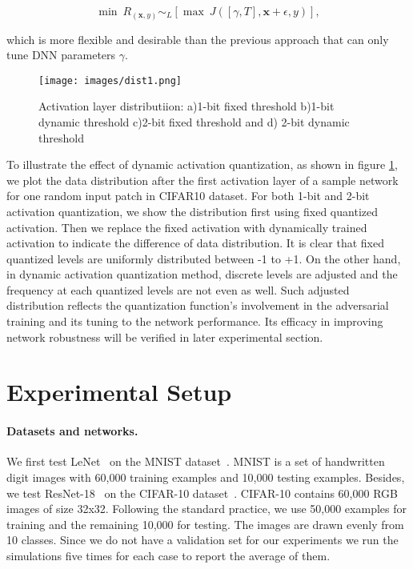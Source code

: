 \documentclass{article}
\def \x{\mathbf{x}}
\begin{document}
\begin{equation}
{\min}\ R_{(\x,y)}\sim_L[\max \ J([\gamma,T],\x+\epsilon,y)],
\end{equation}

which is more flexible and desirable than the previous approach that can only tune DNN parameters $\gamma$.

\begin{figure}[ht]
  \centering
   \texttt{[image: images/dist1.png]}
   \caption{Activation layer distributiion: a)1-bit fixed threshold b)1-bit dynamic threshold c)2-bit fixed threshold and d) 2-bit dynamic threshold}
   \label{dis}
\end{figure}

To illustrate the effect of dynamic activation quantization, as shown in figure \ref{dis}, we plot the data distribution after the first activation layer of a sample network for one random input patch in CIFAR10 dataset. For both 1-bit and 2-bit activation quantization, we show the distribution first using fixed quantized activation. Then we replace the fixed activation with dynamically trained activation to indicate the difference of data distribution. It is clear that fixed quantized levels are uniformly distributed between -1 to +1. On the other hand, in dynamic activation quantization method, discrete levels are adjusted and the frequency at each quantized levels are not even as well. Such adjusted distribution reflects the quantization function's involvement in the adversarial training and its tuning to the network performance. Its efficacy in improving network robustness will be verified in later experimental section. 


\section{Experimental Setup}



\paragraph{Datasets and networks.}
We first test LeNet~\cite{lecun2015lenet} on the MNIST dataset~\cite{lecun1995convolutional}. MNIST is a set of handwritten digit images with 60,000 training examples and 10,000 testing examples. Besides, we test ResNet-18~\cite{he2016deep} on the CIFAR-10 dataset~\cite{krizhevsky2010cifar}. CIFAR-10 contains 60,000 RGB images of size 32x32. Following the standard practice, we use 50,000 examples for training and the remaining 10,000 for testing. The images are drawn evenly from 10 classes. Since we do not have a validation set for our experiments we run the simulations five times for each case to report the average of them. 
\end{document}
